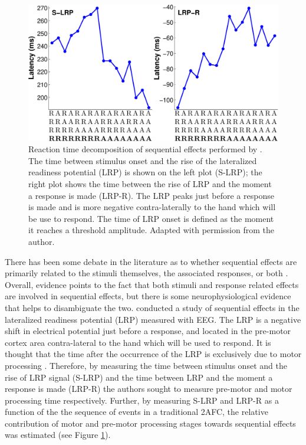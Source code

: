 \documentclass{apa}[12pt]
\begin{document}
\begin{figure}[t]
\centering
\includegraphics[width=.7\textwidth]{slrp_lrpr.pdf}
\caption[S-LRP and LRP-R]{Reaction time decomposition of sequential effects performed by \protect{}. The time between stimulus onset and the rise of the lateralized readiness potential (LRP) is shown on the left plot (S-LRP); the right plot shows the time between the rise of LRP and the moment a response is made (LRP-R). The LRP peaks just before a response is made and is more negative contra-laterally to the hand which will be use to respond. The time of LRP onset is defined as the moment it reaches a threshold amplitude. Adapted with permission from the author.}\label{slrp_lrpr}
\end{figure}

There has been some debate in the literature as to whether sequential effects are primarily related to the stimuli themselves, the associated responses, or both \cite{Bertelson65,Soetens98}. Overall, evidence points to the fact that both stimuli and response related effects are involved in sequential effects, but there is some neurophysiological evidence that helps to disambiguate the two.
 conducted a study of sequential effects in the lateralized readiness potential (LRP) measured with EEG. The LRP is a negative shift in electrical potential just before a response, and located in the pre-motor cortex area contra-lateral to the hand which will be used to respond. It is thought that the time after the occurrence of the LRP is exclusively due to motor processing \cite{Leuthold96}. Therefore, by measuring the time between stimulus onset and the rise of LRP signal (S-LRP) and the time between LRP and the moment a response is made (LRP-R) the authors sought to measure pre-motor and motor processing time respectively.\footnotemark{} Further, by measuring S-LRP and LRP-R as a function of the the sequence of events in a traditional 2AFC, the relative contribution of motor and pre-motor processing stages towards sequential effects was estimated (see Figure \ref{slrp_lrpr}).
\end{document}
